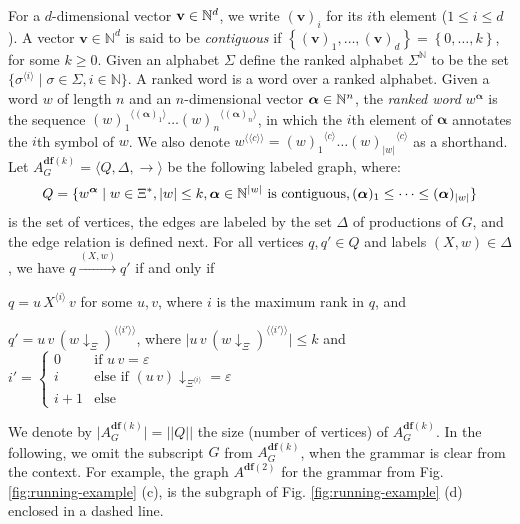 \documentclass[final]{llncs}
\renewcommand{\vec}[1]{{\bf {#1}}}
\newcommand{\nat}{{\bf \mathbb{N}}}
\def\set#1{{\left\{ #1 \right\}}}
\def\tuple#1{{\langle #1 \rangle}}
\def\nats{{\mathbb{N}}}
\def\card#1{{|\!|{#1}|\!|}}
\def\len#1{{\vert{#1}\vert}}
\def\prod{\Delta}
\def\df#1{\scriptscriptstyle\mathbf{df}(#1)}
\def\Vars{\ensuremath{\Xi}}
\def\rank#1{\langle\!\langle#1\rangle\!\rangle}
\renewcommand{\vec}[1]{{\mathbf {#1}}}
\def\proj{\mathbin{\downarrow}}
\renewcommand{\proj}[2]{{#1}\mathclose{\downarrow}_{{#2}}}
\begin{document}
For a \(d\)-dimensional vector \(\vec{v}\in\nat^d\), we
write \((\vec{v})_i\) for its \(i\)th element (\(1 \leq i \leq d\)). A vector \(\boldsymbol{v}\in\nats^d\) is
said to be \emph{contiguous} if
\(\set{(\boldsymbol{v})_1,\ldots,(\boldsymbol{v})_d} = \set{0,\ldots,k} \), 
for some \(k\geq 0\). 
Given an alphabet \(\Sigma\) define the ranked alphabet \(\Sigma^{\nats}\) 
to be the set \( \{ \sigma^{\tuple{i}} \mid \sigma\in\Sigma, i\in\nats \} \).
A ranked word is a word over a ranked alphabet. 
Given a word \(w\) of length \(n\) and an \(n\)-dimensional
vector \(\boldsymbol{\alpha}\in\nat^n\), the \emph{ranked
word} \(w^{\boldsymbol{\alpha}}\) is the sequence
\({(w)_1}^{\tuple{(\boldsymbol{\alpha})_1}}\ldots {(w)_n}^{\tuple{(\boldsymbol{\alpha})_n}}\), 
in which the \(i\)th element of \(\boldsymbol{\alpha}\) annotates the \(i\)th symbol of \(w\). We also denote \(w^{ \rank{c} } =
{(w)_1}^{\tuple{c}} \ldots {(w)_{\len{w}}}^{\tuple{c}}\) as a
shorthand. Let \(A_G^{\df{k}} = \tuple{Q, \prod, \rightarrow}\) be the
following labeled graph, where: 
{\setlength\abovedisplayskip{4pt}
\setlength\belowdisplayskip{4pt}
\[Q = \{ w^{\boldsymbol{\alpha}} \mid w \in \Vars^{*}, \len{w}\leq k, \boldsymbol{\alpha}\in\nat^{\len{w}} 
\text{ is contiguous}, (\boldsymbol{\alpha})_1 \leq \cdots \leq (\boldsymbol{\alpha})_{\len{w}} \}\]}
is the set of vertices, the edges are labeled by the set \(\prod\) of
productions of \(G\), and the edge relation is defined next. For all
vertices \(q,q' \in Q\) and labels \( (X,w)\in \Delta\), we
have \(q \xrightarrow{(X,w)} q'\) if and only if
\begin{compactitem}
\item \( q = u\, X^{\tuple{i}}\, v\) for some \(u,v\), where \(i\) is the maximum rank in \(q\), and 
\item \( q'= u\, v\, (\proj{w}{\Vars})^{\rank{i'}} \), 
where \(\len{u\, v\, (\proj{w}{\Vars})^{\rank{i'}}}\leq k\) and \( i' = \begin{cases}
  0 & \text{if } u\, v = \varepsilon\\
	i & \text{else if } \proj{(u\, v)}{\Vars^{\tuple{i}}} = \varepsilon\\
	i+1 & \text{else}
\end{cases}\) 
\end{compactitem}
We denote
by \(\len{A^{\df{k}}_G} = \card{Q}\) the size (number of vertices)
of \(A^{\df{k}}_G\). In the following, we omit the subscript $G$
from \(A^{\df{k}}_G\), when the grammar is clear from the context. For
example, the graph \(A^{\df{2}}\) for the grammar from
Fig. \ref{fig:running-example} (c), is the subgraph of
Fig. \ref{fig:running-example} (d) enclosed in a dashed line.
\end{document}

